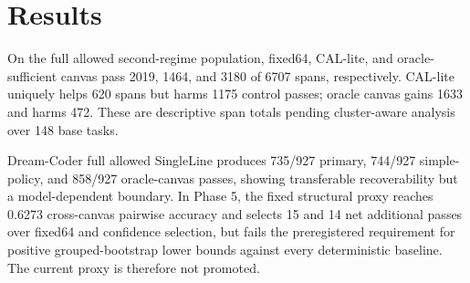 \section{Results}
On the full allowed second-regime population, fixed64, CAL-lite, and oracle-sufficient canvas pass 2019, 1464, and 3180 of 6707 spans, respectively. CAL-lite uniquely helps 620 spans but harms 1175 control passes; oracle canvas gains 1633 and harms 472. These are descriptive span totals pending cluster-aware analysis over 148 base tasks.

Dream-Coder full allowed SingleLine produces 735/927 primary, 744/927 simple-policy, and 858/927 oracle-canvas passes, showing transferable recoverability but a model-dependent boundary. In Phase 5, the fixed structural proxy reaches 0.6273 cross-canvas pairwise accuracy and selects 15 and 14 net additional passes over fixed64 and confidence selection, but fails the preregistered requirement for positive grouped-bootstrap lower bounds against every deterministic baseline. The current proxy is therefore not promoted.
